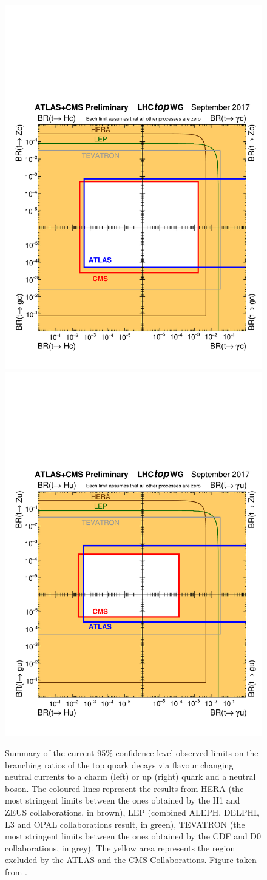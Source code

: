 \begin{figure}[htbp]
	\centering
	\includegraphics[width=0.49\linewidth]{1_Introduction/Figures/fcnc_tXc_sep17.pdf}
	\includegraphics[width=0.49\linewidth]{1_Introduction/Figures/fcnc_tXu_sep17.pdf}
	\caption{Summary of the current 95\% confidence level observed limits on the branching ratios of the top quark decays via flavour changing neutral currents to a charm (left) or up (right) quark and a neutral boson. The coloured lines represent the results from HERA (the most stringent limits between the ones obtained by the H1 and ZEUS collaborations, in brown), LEP (combined ALEPH, DELPHI, L3 and OPAL collaborations result, in green), TEVATRON (the most stringent limits between the ones obtained by the CDF and D0 collaborations, in grey). The yellow area represents the region excluded by the ATLAS and the CMS Collaborations. Figure taken from \cite{summarytwiki}.}
	\label{fig:FCNCATLASCMS}
\end{figure}
